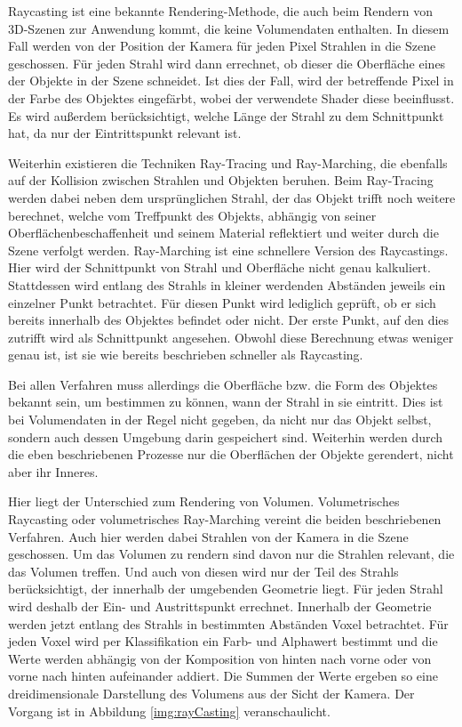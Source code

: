 Raycasting ist eine bekannte Rendering-Methode, die auch beim Rendern von 3D-Szenen zur Anwendung kommt, die keine Volumendaten enthalten.
In diesem Fall werden von der Position der Kamera für jeden Pixel Strahlen in die Szene geschossen. Für jeden Strahl wird dann errechnet, ob dieser die Oberfläche eines der Objekte in der Szene schneidet. Ist dies der Fall, wird der betreffende Pixel in der Farbe des Objektes eingefärbt, wobei der verwendete Shader diese beeinflusst. Es wird außerdem berücksichtigt, welche Länge der Strahl zu dem Schnittpunkt hat, da nur der Eintrittspunkt relevant ist.

Weiterhin existieren die Techniken Ray-Tracing und Ray-Marching, die ebenfalls auf der Kollision zwischen Strahlen und Objekten beruhen.
Beim Ray-Tracing werden dabei neben dem ursprünglichen Strahl, der das Objekt trifft noch weitere berechnet, welche vom Treffpunkt des Objekts, abhängig von seiner Oberflächenbeschaffenheit und seinem Material reflektiert und weiter durch die Szene verfolgt werden.
Ray-Marching ist eine schnellere Version des Raycastings. 
Hier wird der Schnittpunkt von Strahl und Oberfläche nicht genau kalkuliert. Stattdessen wird entlang des Strahls in kleiner werdenden Abständen jeweils ein einzelner Punkt betrachtet. Für diesen Punkt wird lediglich geprüft, ob er sich bereits innerhalb des Objektes befindet oder nicht. Der erste Punkt, auf den dies zutrifft wird als Schnittpunkt angesehen. Obwohl diese Berechnung etwas weniger genau ist, ist sie wie bereits beschrieben schneller als Raycasting.

Bei allen Verfahren muss allerdings die Oberfläche bzw. die Form des Objektes bekannt sein, um bestimmen zu können, wann der Strahl in sie eintritt. Dies ist bei Volumendaten in der Regel nicht gegeben, da nicht nur das Objekt selbst, sondern auch dessen Umgebung darin gespeichert sind. Weiterhin werden durch die eben beschriebenen Prozesse nur die Oberflächen der Objekte gerendert, nicht aber ihr Inneres.

Hier liegt der Unterschied zum Rendering von Volumen. Volumetrisches Raycasting oder volumetrisches Ray-Marching vereint die beiden beschriebenen Verfahren. Auch hier werden dabei Strahlen von der Kamera in die Szene geschossen. Um das Volumen zu rendern sind davon nur die Strahlen relevant, die das Volumen treffen. Und auch von diesen wird nur der Teil des Strahls berücksichtigt, der innerhalb der umgebenden Geometrie liegt. Für jeden Strahl wird deshalb der Ein- und Austrittspunkt errechnet. Innerhalb der Geometrie werden jetzt entlang des Strahls in bestimmten Abständen Voxel betrachtet. Für jeden Voxel wird per Klassifikation ein Farb- und Alphawert bestimmt und die Werte werden abhängig von der Komposition von hinten nach vorne oder von vorne nach hinten aufeinander addiert. Die Summen der Werte ergeben so eine dreidimensionale Darstellung des Volumens aus der Sicht der Kamera. Der Vorgang ist in Abbildung \ref{img:rayCasting} veranschaulicht.


